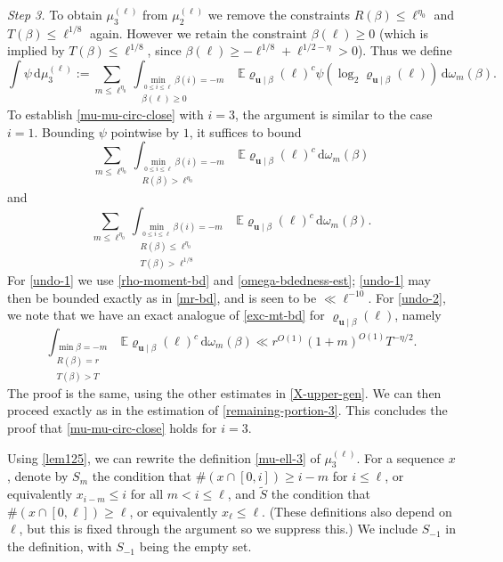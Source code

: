 \documentclass[11pt,reqno]{amsart}
\numberwithin{equation}{section}
\theoremstyle{definition}
\theoremstyle{remark}
\newcommand{\mb}{\mathbb}
\newcommand{\mbf}{\mathbf}
\renewcommand{\le}{\leqslant}
\renewcommand{\ge}{\geqslant}
\begin{document}
\emph{Step 3.} To obtain $\mu_3^{(\ell)}$ from $\mu_2^{(\ell)}$ we remove the constraints $R(\beta) \le \ell^{\eta_0}$ and $T(\beta) \le \ell^{1/8}$ again. However we retain the constraint $\beta(\ell) \ge 0$ (which is implied by $T(\beta) \le \ell^{1/8}$, since $\beta(\ell) \ge -\ell^{1/8} + \ell^{1/2 - \eta} > 0$). Thus we define
\begin{equation}\label{mu-ell-3} \int \psi \, \mathrm{d} \mu_3^{(\ell)} := \sum_{m \le \ell^{\eta_0}}\int_{\substack{\min_{0 \le i \le \ell} \beta(i) = -m\\ \beta(\ell) \ge 0}} \mb{E} \varrho_{\mbf{u} \mid \beta}(\ell)^c \psi (\log_2 \varrho_{\mbf{u} \mid \beta}(\ell)) \, \mathrm{d}\omega_m(\beta).\end{equation} 
To establish \cref{mu-mu-circ-close} with $i = 3$, the argument is similar to the case $i = 1$. Bounding $\psi$ pointwise by $1$, it suffices to bound
\begin{equation}\label{undo-1} \sum_{m \le \ell^{\eta_0}} \int_{\substack{\min_{0 \le i \le \ell} \beta(i) = -m \\ R(\beta) > \ell^{\eta_0}}} \mb{E}\varrho_{\mbf{u} \mid \beta}(\ell)^c \, \mathrm{d}\omega_m(\beta)\end{equation}
and
\begin{equation}\label{undo-2} \sum_{m \le \ell^{\eta_0}} \int_{\substack{\min_{0 \le i \le \ell} \beta(i) = -m \\ R(\beta) \le  \ell^{\eta_0} \\ T(\beta) > \ell^{1/8}}} \mb{E}\varrho_{\mbf{u} \mid \beta}(\ell)^c \, \mathrm{d}\omega_m(\beta).\end{equation}
For \cref{undo-1} we use \cref{rho-moment-bd} and \cref{omega-bdedness-est}; \cref{undo-1} may then be bounded exactly as in \cref{mr-bd}, and is seen to be $\ll \ell^{-10}$. For \cref{undo-2}, we note that we have an exact analogue of \cref{exc-mt-bd} for $\varrho_{\mbf{u} \mid \beta}(\ell)$, namely 
\[ \int_{\substack{\min \beta = -m \\ R(\beta) = r \\ T(\beta) > T}} \mb{E}\varrho_{\mbf{u} \mid \beta}(\ell)^c\, \mathrm{d}\omega_m(\beta) \ll r^{O(1)}(1 + m)^{O(1)} T^{-\eta/2}.\] The proof is the same, using the other estimates in \cref{X-upper-gen}. We can then proceed exactly as in the estimation of \cref{remaining-portion-3}. This concludes the proof that \cref{mu-mu-circ-close} holds for $i = 3$.\vspace*{8pt}


Using \cref{lem125}, we can rewrite the definition \cref{mu-ell-3} of $\mu_3^{(\ell)}$. For a sequence $x$, denote by $S_{m}$ the condition that $\# (x \cap [0,i]) \ge i - m$ for $i \le \ell$, or equivalently $x_{i - m} \le i$ for all $m < i \le \ell$, and $\tilde S$ the condition that $\# (x \cap [0,\ell]) \ge \ell$, or equivalently $x_{\ell} \le \ell$. (These definitions also depend on $\ell$, but this is fixed through the argument so we suppress this.) We include $S_{-1}$ in the definition, with $S_{-1}$ being the empty set.
\end{document}
